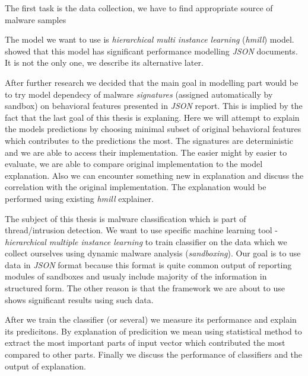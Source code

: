 The first task is the data collection, we have to find appropriate source of malware samples \todo{}

The model we want to use is \emph{hierarchical multi instance learning} (\emph{hmill}) model. \cite{Mandlik2020} showed that this model has significant performance modelling \emph{JSON} documents. It is not the only one, we describe its alternative later.

After further research we decided that the main goal in modelling part would be to try model dependecy of malware \emph{signatures} (assigned automatically by sandbox) on behavioral features presented in \emph{JSON} report. This is implied by the fact that the last goal of this thesis is explaning. Here we will attempt to explain the models predictions by choosing minimal subset of original behavioral features which contributes to the predictions the most. The signatures are deterministic and we are able to access their implementation. The easier might by easier to evaluate, we are able to compare original implementation to the model explanation. Also we can encounter something new in explanation and discuss the correlation with the original implementation. The explanation would be performed using existing \emph{hmill} explainer.






The subject of this thesis is malware classification which is part of thread/intrusion detection. We want to use specific machine learning tool - \emph{hierarchical multiple instance learning} to train classifier on the data which we collect ourselves using dynamic malware analysis (\emph{sandboxing}). Our goal is to use data in \emph{JSON} format because this format is quite common output of reporting modules of sandboxes and usualy include majority of the information in structured form. The other reason is that the framework we are about to use shows significant results using such data.

After we train the classifier (or several) we measure its performance and explain its predicitons. By explanation of predicition we mean using statistical method to extract the most important parts of input vector which contributed the most compared to other parts. Finally we discuss the performance of classifiers and the output of explanation.



